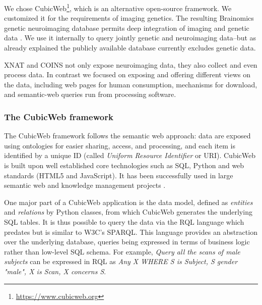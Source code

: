 \documentclass[preprint,12pt]{elsarticle}
\begin{document}
We chose CubicWeb\footnote{\url{https://www.cubicweb.org}}, which is an alternative open-source framework. We customized it for the requirements of imaging genetics. The resulting Brainomics genetic neuroimaging database permits deep integration of imaging and genetic data \cite{HBM2013}. We use it internally to query jointly genetic and neuroimaging data--but as already explained the publicly available database currently excludes genetic data.

XNAT and COINS not only expose neuroimaging data, they also collect and even process data. In contrast we focused on exposing and offering different views on the data, including web pages for human consumption, mechanisms for download, and semantic-web queries run from processing software.

\subsubsection{The CubicWeb framework}
\label{sec:cubicweb}

The CubicWeb framework follows the semantic web approach: data are exposed using ontologies for easier sharing, access, and processing, and each item is identified by a unique ID (called \textit{Uniform Resource Identifier} or URI). CubicWeb is built upon well established core technologies such as SQL, Python and web standards (HTML5 and JavaScript). It has been successfully used in large semantic web and knowledge management projects \cite{Simon2013}.

One major part of a CubicWeb application is the data model, defined as \textit{entities} and \textit{relations} by Python classes, from which CubicWeb generates the underlying SQL tables. It is thus possible to query the data via the RQL language which predates but is similar to W3C's SPARQL. This language provides an abstraction over the underlying database, queries being expressed in terms of business logic rather than low-level SQL schema. For example, \emph{Query all the scans of male subjects} can be expressed in RQL as \emph{Any X WHERE S is Subject, S gender "male", X is Scan, X concerns S}.
\end{document}
